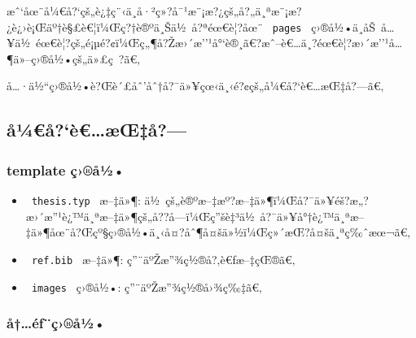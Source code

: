 æˆ`åœ¨å¼€å?{}`çš„è¿‡ç¨‹ä¸­å·²ç»?å¯¹æ¨¡æ?¿çš„å?„ä¸ªæ¨¡æ?¿è¿›è¡Œäº†è§£è€¦ï¼Œç?†è®ºä¸Šä½~å?ªéœ€è¦?åœ¨
\texttt{\ pages\ }
ç›®å½•ä¸­åŠ~å\ldots¥ä½~éœ€è¦?çš„é¡µé?¢ï¼Œç„¶å?Žæ›´æ''¹å°`è®¸ã€?æˆ--è€\ldots ä¸?éœ€è¦?æ›´æ''¹å\ldots¶ä»--ç›®å½•çš„ä»£ç~?ã€‚

å\ldots·ä½``ç›®å½•è?Œè´£åˆ'åˆ†å?¯ä»¥çœ‹ä¸‹é?¢çš„å¼€å?{}`è€\ldots æŒ‡å?---ã€‚

\subsection{å¼€å?{}`è€\ldots æŒ‡å?---}\label{uxe5uxbcuxe5uxe8uxe6ux153uxe5}

\subsubsection{template ç›®å½•}\label{template-uxe7uxe5uxbd}

\begin{itemize}
\tightlist
\item
  \texttt{\ thesis.typ\ } æ--‡ä»¶:
  ä½~çš„è®ºæ--‡æº?æ--‡ä»¶ï¼Œå?¯ä»¥éš?æ„?æ›´æ''¹è¿™ä¸ªæ--‡ä»¶çš„å??å­---ï¼Œç''šè‡³ä½~å?¯ä»¥å°†è¿™ä¸ªæ--‡ä»¶åœ¨å?Œçº§ç›®å½•ä¸‹å¤?åˆ¶å¤šä»½ï¼Œç»´æŒ?å¤šä¸ªç‰ˆæœ¬ã€‚
\item
  \texttt{\ ref.bib\ } æ--‡ä»¶: ç''¨äºŽæ''¾ç½®å?‚è€ƒæ--‡çŒ®ã€‚
\item
  \texttt{\ images\ } ç›®å½•: ç''¨äºŽæ''¾ç½®å›¾ç‰‡ã€‚
\end{itemize}

\subsubsection{å†\ldots éƒ¨ç›®å½•}\label{uxe5uxe9ux192uxe7uxe5uxbd}

